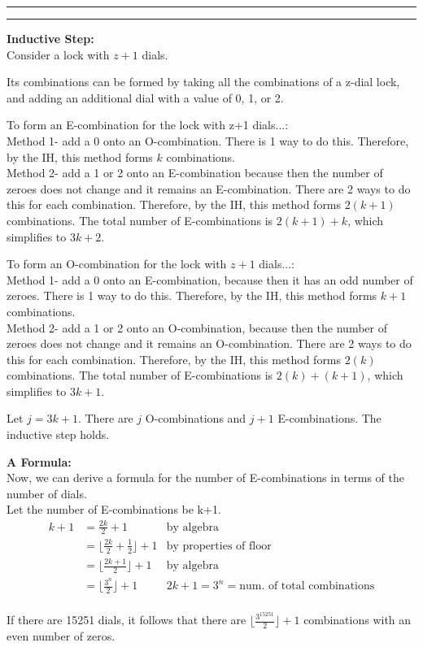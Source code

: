 \documentclass[11pt]{article}
\newcounter{questionCounter}
\newcounter{partCounter}[questionCounter]
\newenvironment{question}[2][\arabic{questionCounter}]{%
    \setcounter{partCounter}{0}%
    \vspace{.25in} \hrule \vspace{0.5em}%
        \noindent{\bf #2}%
    \vspace{0.8em} \hrule \vspace{.10in}%
    \addtocounter{questionCounter}{1}%
}{}
\begin{document}
\begin{question}{In Lament of Locks}
\textbf{Inductive Step:}\\
Consider a lock with $z+1$ dials.

Its combinations can be formed by taking all the combinations of a z-dial lock,
and adding an additional dial with a value of 0, 1, or 2.

To form an E-combination for the lock with z+1 dials...:\\
Method 1- add a 0 onto an O-combination. There is 1 way to do this. Therefore, by 
the IH, this method forms $k$ combinations.\\
Method 2- add a 1 or 2 onto an E-combination because then the number of zeroes 
does not change and it remains an E-combination. There are 2 ways to do this for each
combination. Therefore, by the IH, this method forms $2(k+1)$ combinations.
The total number of E-combinations is $2(k+1)+k$, which simplifies to $3k+2$.

To form an O-combination for the lock with $z+1$ dials...:\\
Method 1- add a 0 onto an E-combination, because then it has an odd number of 
zeroes. There is 1 way to do this. Therefore, by 
the IH, this method forms $k+1$ combinations.\\
Method 2- add a 1 or 2 onto an O-combination, because then the number of zeroes 
does not change and it remains an O-combination. There are 2 ways to do this for
each combination. Therefore, by the IH, this method forms $2(k)$ combinations.
The total number of E-combinations is $2(k)+(k+1)$, which simplifies to $3k+1$.

Let $j = 3k+1$. There are $j$ O-combinations and $j+1$ E-combinations. The inductive 
step holds.

\textbf{A Formula:}\\
Now, we can derive a formula for the number of E-combinations in terms of the 
number of dials.\\
Let the number of E-combinations be k+1.
\begin{align*}
k+1 &= \frac{2k}{2} + 1 & \mbox{by algebra}\\
&= \lfloor \frac{2k}{2} + \frac{1}{2} \rfloor + 1 & \mbox{by properties of floor}\\
&= \lfloor \frac{2k+1}{2} \rfloor + 1 & \mbox{by algebra}\\
&= \lfloor \frac{3^{n}}{2} \rfloor + 1 & 2k+1 = 3^n = \mbox{num. of total combinations}\\
\end{align*}

If there are 15251 dials, it follows that there are $\lfloor \frac{3^{15251}}{2} \rfloor + 1$ 
combinations with an even number of zeros.
\end{question}
\end{document}

